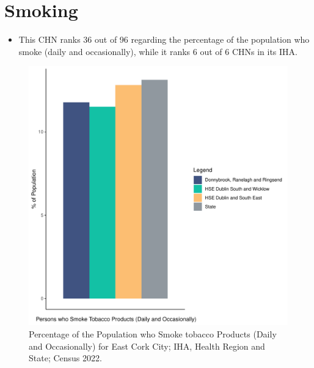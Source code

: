\documentclass{article}
\begin{document}
\pagebreak

\section{Smoking}\label{sect:Smoking}
\begin{itemize}
\item This CHN ranks  36 out of 96 regarding the percentage of the population who smoke (daily and occasionally), while it ranks   6 out of 6 CHNs in its IHA.
\end{itemize}
\begin{figure}[H]
	\centering
	\includegraphics[width = 120mm]{../figures/SmokingED.pdf}
	\caption{Percentage of the Population who Smoke tobacco Products (Daily and Occasionally) for East Cork City; IHA, Health Region and State; Census 2022.}
	\label{fig:2ae19629-1a6a-13a3-e055-000000000001}
	\end{figure}
	
\end{document}
